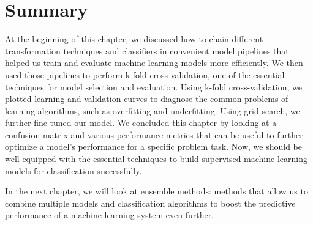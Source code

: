 \documentclass[11pt]{article}
\begin{document}
    \section{Summary}\label{summary}

    At the beginning of this chapter, we discussed how to chain different
transformation techniques and classifiers in convenient model pipelines
that helped us train and evaluate machine learning models more
efficiently. We then used those pipelines to perform k-fold
cross-validation, one of the essential techniques for model selection
and evaluation. Using k-fold cross-validation, we plotted learning and
validation curves to diagnose the common problems of learning
algorithms, such as overfitting and underfitting. Using grid search, we
further fine-tuned our model. We concluded this chapter by looking at a
confusion matrix and various performance metrics that can be useful to
further optimize a model's performance for a specific problem task. Now,
we should be well-equipped with the essential techniques to build
supervised machine learning models for classification successfully.

In the next chapter, we will look at ensemble methods: methods that
allow us to combine multiple models and classification algorithms to
boost the predictive performance of a machine learning system even
further.


    
    
    
    
\end{document}
